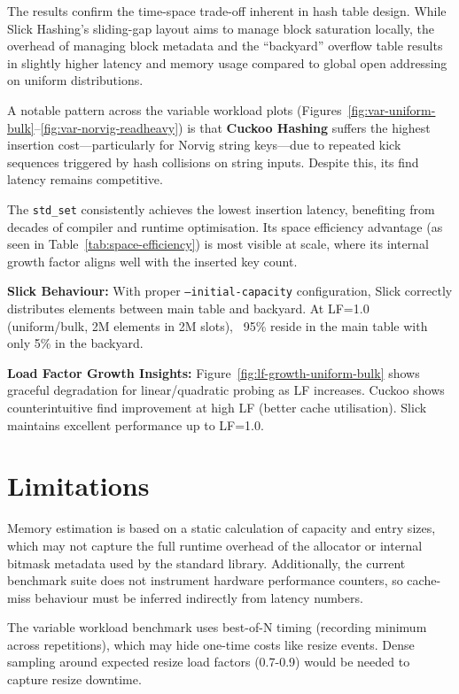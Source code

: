 \documentclass[11pt,a4paper]{article}
\begin{document}
The results confirm the time-space trade-off inherent in hash table design. While Slick Hashing's sliding-gap layout aims to manage block saturation locally, the overhead of managing block metadata and the ``backyard'' overflow table results in slightly higher latency and memory usage compared to global open addressing on uniform distributions.

A notable pattern across the variable workload plots (Figures~\ref{fig:var-uniform-bulk}--\ref{fig:var-norvig-readheavy}) is that \textbf{Cuckoo Hashing} suffers the highest insertion cost---particularly for Norvig string keys---due to repeated kick sequences triggered by hash collisions on string inputs. Despite this, its find latency remains competitive.

The \texttt{std\_set} consistently achieves the lowest insertion latency, benefiting from decades of compiler and runtime optimisation. Its space efficiency advantage (as seen in Table~\ref{tab:space-efficiency}) is most visible at scale, where its internal growth factor aligns well with the inserted key count.

\textbf{Slick Behaviour:} With proper \texttt{--initial-capacity} configuration, Slick correctly distributes elements between main table and backyard. At LF=1.0 (uniform/bulk, 2M elements in 2M slots), ~95\% reside in the main table with only 5\% in the backyard.

\textbf{Load Factor Growth Insights:} Figure~\ref{fig:lf-growth-uniform-bulk} shows graceful degradation for linear/quadratic probing as LF increases. Cuckoo shows counterintuitive find improvement at high LF (better cache utilisation). Slick maintains excellent performance up to LF=1.0.

\section{Limitations}

Memory estimation is based on a static calculation of capacity and entry sizes, which may not capture the full runtime overhead of the allocator or internal bitmask metadata used by the standard library. Additionally, the current benchmark suite does not instrument hardware performance counters, so cache-miss behaviour must be inferred indirectly from latency numbers.

The variable workload benchmark uses best-of-N timing (recording minimum across repetitions), which may hide one-time costs like resize events. Dense sampling around expected resize load factors (0.7-0.9) would be needed to capture resize downtime.
\end{document}
